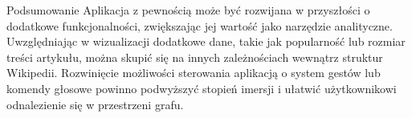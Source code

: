 \begin{chapter}{Podsumowanie}
	Aplikacja z pewnością może być rozwijana w przyszłości o dodatkowe funkcjonalności, zwiększając jej wartość jako narzędzie analityczne. Uwzględniając w wizualizacji dodatkowe dane, takie jak popularność lub rozmiar treści artykułu, można skupić się na innych zależnościach wewnątrz struktur Wikipedii. Rozwinięcie możliwości sterowania aplikacją o system gestów lub komendy głosowe powinno podwyższyć stopień imersji i ułatwić użytkownikowi odnalezienie się w przestrzeni grafu.

\end{chapter}
